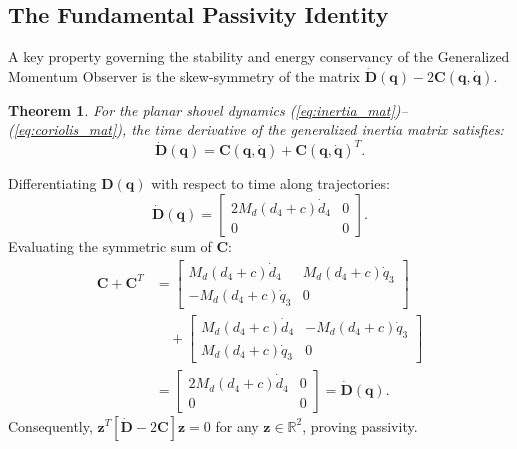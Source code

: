 \documentclass[journal]{IEEEtran}
\begin{document}
\subsection{The Fundamental Passivity Identity}
A key property governing the stability and energy conservancy of the Generalized Momentum Observer is the skew-symmetry of the matrix $\dot{\bm{D}}(\bm{q}) - 2\bm{C}(\bm{q},\dot{\bm{q}})$.

\newtheorem{theorem}{Theorem}
\begin{theorem}
For the planar shovel dynamics (\ref{eq:inertia_mat})--(\ref{eq:coriolis_mat}), the time derivative of the generalized inertia matrix satisfies:
\begin{equation}
\dot{\bm{D}}(\bm{q}) = \bm{C}(\bm{q},\dot{\bm{q}}) + \bm{C}(\bm{q},\dot{\bm{q}})^T.
\label{eq:passivity_id}
\end{equation}
\end{theorem}
\begin{IEEEproof}
Differentiating $\bm{D}(\bm{q})$ with respect to time along trajectories:
\begin{equation}
\dot{\bm{D}}(\bm{q}) = \begin{bmatrix} 2 M_d (d_4+c)\dot{d}_4 & 0 \\ 0 & 0 \end{bmatrix}.
\end{equation}
Evaluating the symmetric sum of $\bm{C}$:
\begin{align}
\bm{C} + \bm{C}^T &= \begin{bmatrix} M_d(d_4+c)\dot{d}_4 & M_d(d_4+c)\dot{q}_3 \\ -M_d(d_4+c)\dot{q}_3 & 0 \end{bmatrix} \nonumber \\
&\quad + \begin{bmatrix} M_d(d_4+c)\dot{d}_4 & -M_d(d_4+c)\dot{q}_3 \\ M_d(d_4+c)\dot{q}_3 & 0 \end{bmatrix} \nonumber \\
&= \begin{bmatrix} 2 M_d(d_4+c)\dot{d}_4 & 0 \\ 0 & 0 \end{bmatrix} = \dot{\bm{D}}(\bm{q}).
\end{align}
Consequently, $\bm{z}^T [\dot{\bm{D}} - 2\bm{C}] \bm{z} = 0$ for any $\bm{z} \in \mathbb{R}^2$, proving passivity.
\end{IEEEproof}
\end{document}
